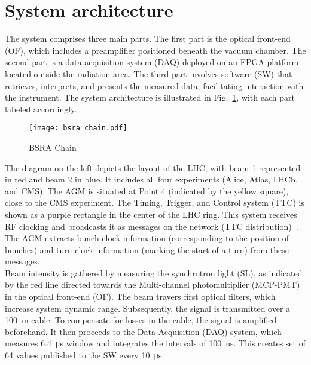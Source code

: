 \section{System architecture}
The system comprises three main parts. The first part is the optical front-end
(OF), which includes a preamplifier positioned beneath the vacuum chamber. The
second part is a data acquisition system (DAQ) deployed on an FPGA platform
located outside the radiation area. The third part involves software (SW) that
retrieves, interprets, and presents the measured data, facilitating interaction
with the instrument. The system architecture is illustrated in
Fig.~\ref{fig:bsra_chain}, with each part labeled accordingly.
\begin{figure}[!tbh]
    \centering
    \texttt{[image: bsra\_chain.pdf]}
    \caption{BSRA Chain}
    \label{fig:bsra_chain}
\end{figure} 
The diagram on the left depicts the layout of the LHC, with beam 1 represented
in red and beam 2 in blue. It includes all four experiments (Alice, Atlas,
LHCb, and CMS). The AGM is situated at Point 4 (indicated by the yellow
square), close to the CMS experiment. The Timing, Trigger, and Control system
(TTC) is shown as a purple rectangle in the center of the LHC ring. This system
receives RF clocking and broadcasts it as messages on the network (TTC
distribution)~\cite{ttc_distribution}. The AGM extracts bunch clock information
(corresponding to the position of bunches) and turn clock information (marking
the start of a turn) from these messages.\\
Beam intensity is gathered by measuring the synchrotron light (SL), as
indicated by the red line directed towards the Multi-channel photomultiplier
(MCP-PMT) in the optical front-end (OF). The beam travers first optical
filters, which increase system dynamic range. Subsequently, the signal is
transmitted over a \SI{100}{m} cable. To compensate for losses in the cable,
the signal is amplified beforehand. It then proceeds to the Data Acquisition
(DAQ) system, which measures \SI{6.4}{\micro\second} window and integrates the
intervals of \SI{100}{\nano\second}. This creates set of 64 values published to
the SW every \SI{10}{\micro\second}.

